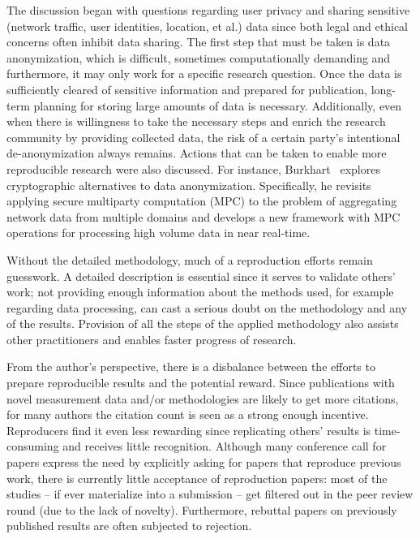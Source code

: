 The discussion began with questions regarding user privacy and sharing
sensitive (network traffic, user identities, location, et al.) data since both
legal and ethical concerns often inhibit data sharing. The first step that
must be taken is data anonymization, which is difficult, sometimes
computationally demanding and furthermore, it may only work for a specific
research question. Once the data is sufficiently cleared of sensitive
information and prepared for publication, long-term planning for storing large
amounts of data is necessary.  Additionally, even when there is willingness to
take the necessary steps and enrich the research community by providing
collected data, the risk of a certain party's intentional de-anonymization
always remains. Actions that can be taken to enable more reproducible research
were also discussed. For instance, Burkhart~\cite{burkhart2011thesis} explores
cryptographic alternatives to data anonymization. Specifically, he revisits
applying secure multiparty computation (MPC) to the problem of aggregating
network data from multiple domains and develops a new framework with MPC
operations for processing high volume data in near real-time.

Without the detailed methodology, much of a reproduction efforts remain
guesswork. A detailed description is essential since it serves to validate
others' work; not providing enough information about the methods used, for
example regarding data processing, can cast a serious doubt on the methodology
and any of the results.  Provision of all the steps of the applied methodology
also assists other practitioners and enables faster progress of research.

From the author's perspective, there is a disbalance between the efforts to
prepare reproducible results and the potential reward. Since publications with
novel measurement data and/or methodologies are likely to get more citations,
for many authors the citation count is seen as a strong enough incentive.
Reproducers find it even less rewarding since replicating others' results is
time-consuming and receives little recognition. Although many conference call
for papers express the need by explicitly asking for papers that reproduce
previous work, there is currently little acceptance of reproduction papers:
most of the studies -- if ever materialize into a submission -- get filtered
out in the peer review round (due to the lack of novelty). Furthermore,
rebuttal papers on previously published results are often subjected to
rejection.

